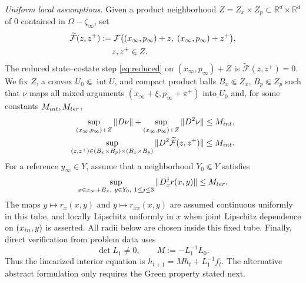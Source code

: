 \documentclass[twocolumn,nameyear,amsthm]{autart}
\newcommand{\R}{\mathbb R}
\newcommand{\xinf}{x_\infty}
\newcommand{\pinf}{p_\infty}
\numberwithin{equation}{section}
\begin{document}
\medskip\noindent\textit{Uniform local assumptions.}
Given a product neighborhood $Z=Z_x\times Z_p\subset\R^d\times\R^d$ of $0$ contained in $\Omega-\zeta_\infty$, set
\begin{equation}\label{eq:tildeF-def}
\begin{aligned}
      \widetilde{\mathcal F}(z,z^+)
      &:=\mathcal F\bigl((\xinf,\pinf)+z,\;(\xinf,\pinf)+z^+\bigr),\\
      &\hspace{1.4em} z,z^+\in Z .
\end{aligned}
\end{equation}
The reduced state--costate step \eqref{eq:reduced} on
$(\xinf,\pinf)+Z$ is $\widetilde{\mathcal F}(z,z^+)=0$.  We fix $Z$,
a convex $U_0\Subset\operatorname{int}U$, and compact product balls
$B_x\Subset Z_x$, $B_p\Subset Z_p$ such that $\nu$ maps all mixed
arguments $(\xinf+\xi,\pinf+\pi^+)$ into $U_0$ and, for some constants
$M_{\rm int},M_{\rm ter}$,
\[
\begin{aligned}
      \sup_{(\xinf,\pinf)+Z}\|D\nu\|
      +\sup_{(\xinf,\pinf)+Z}\|D^2\nu\|
      &\le M_{\rm int},\\
      \sup_{(z,z^+)\in(B_x\times B_p)\times(B_x\times B_p)}
      \|D^2\widetilde{\mathcal F}(z,z^+)\|
      &\le M_{\rm int}.
\end{aligned}
\]
For a reference $y_\infty\in Y$, assume that a neighborhood
$Y_0\Subset Y$ satisfies
\[
       \sup_{x\in \xinf+B_x,\ y\in Y_0,\ 1\le j\le3}
       \|D_x^j r(x,y)\|\le M_{\rm ter}.
\]
The maps $y\mapsto r_x(x,y)$ and $y\mapsto r_{xx}(x,y)$ are assumed
continuous uniformly in this tube, and locally Lipschitz uniformly in $x$
when joint Lipschitz dependence on $(x_{\rm in},y)$ is asserted.  All radii
below are chosen inside this fixed tube.  Finally, direct verification from problem data
uses
\begin{equation}\label{eq:explicit-transition}
       \det L_1\ne0,\qquad M:=-L_1^{-1}L_0 .
\end{equation}
Thus the linearized interior equation is
$h_{t+1}=Mh_t+L_1^{-1}f_t$.  The alternative abstract formulation only
requires the Green property stated next.
\end{document}
